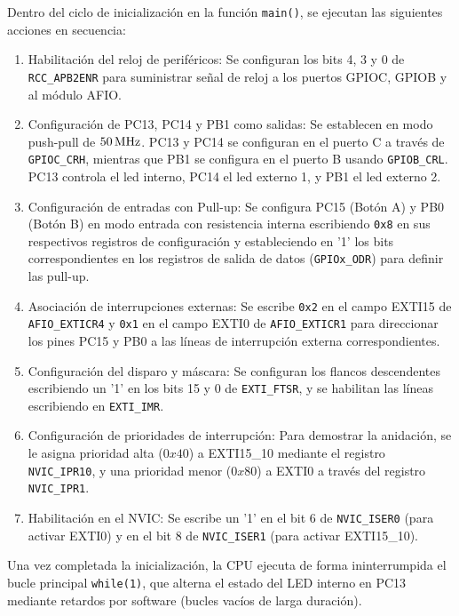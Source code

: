 Dentro del ciclo de inicialización en la función \texttt{main()}, se ejecutan las siguientes acciones en secuencia:
\begin{enumerate}
    \item Habilitación del reloj de periféricos: Se configuran los bits 4, 3 y 0 de \texttt{RCC\_APB2ENR} para
    suministrar señal de reloj a los puertos GPIOC, GPIOB y al módulo AFIO.
    \item Configuración de PC13, PC14 y PB1 como salidas: Se establecen en modo push-pull de $50\,\mathrm{MHz}$.
    PC13 y PC14 se configuran en el puerto C a través de \texttt{GPIOC\_CRH}, mientras que PB1 se
    configura en el puerto B usando \texttt{GPIOB\_CRL}. PC13 controla el led interno, PC14 el led externo 1,
    y PB1 el led externo 2.
    \item Configuración de entradas con Pull-up: Se configura PC15 (Botón A) y PB0 (Botón B) en modo entrada con
    resistencia interna escribiendo \texttt{0x8} en sus respectivos registros de configuración y estableciendo
    en '1' los bits correspondientes en los registros de salida de datos (\texttt{GPIOx\_ODR}) para definir
    las pull-up.
    \item Asociación de interrupciones externas: Se escribe \texttt{0x2} en el campo EXTI15 de \texttt{AFIO\_EXTICR4}
    y \texttt{0x1} en el campo EXTI0 de \texttt{AFIO\_EXTICR1} para direccionar los pines PC15 y PB0 a las líneas
    de interrupción externa correspondientes.
    \item Configuración del disparo y máscara: Se configuran los flancos descendentes escribiendo un '1' en los
    bits 15 y 0 de \texttt{EXTI\_FTSR}, y se habilitan las líneas escribiendo en \texttt{EXTI\_IMR}.
    \item Configuración de prioridades de interrupción: Para demostrar la anidación, se le asigna prioridad alta
    ($0x40$) a EXTI15\_10 mediante el registro \texttt{NVIC\_IPR10}, y una prioridad menor ($0x80$) a EXTI0 a través
    del registro \texttt{NVIC\_IPR1}.
    \item Habilitación en el NVIC: Se escribe un '1' en el bit 6 de \texttt{NVIC\_ISER0} (para activar EXTI0) y en el
    bit 8 de \texttt{NVIC\_ISER1} (para activar EXTI15\_10).
\end{enumerate}

Una vez completada la inicialización, la CPU ejecuta de forma ininterrumpida el bucle principal \texttt{while(1)},
que alterna el estado del LED interno en PC13 mediante retardos por software (bucles vacíos de larga duración).

